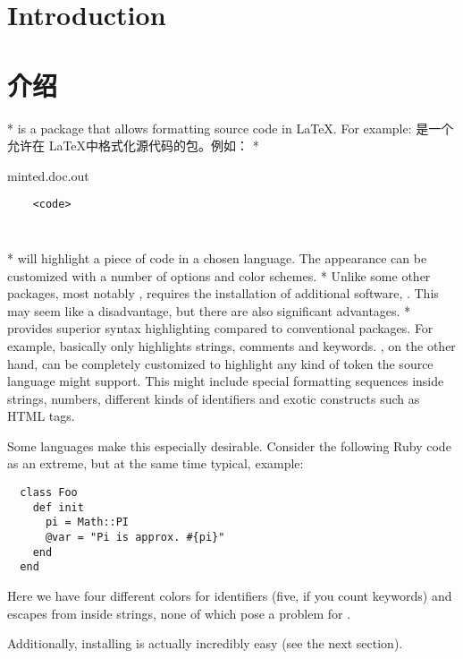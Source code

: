 \begin{paracol}{2}
\section{Introduction}
\switchcolumn
\section{介绍}
\switchcolumn[0]*%
 is a package that allows formatting source code in \LaTeX.
For example:
\switchcolumn
{} 是一个允许在 \LaTeX 中格式化源代码的包。例如：
\switchcolumn[0]*%
\begin{VerbatimOut}[gobble=1]{minted.doc.out}
  \begin{verbatim}
    <code>
  \end{verbatim}
\end{VerbatimOut}
\inputminted[gobble=2,frame=lines]{latex}{minted.doc.out}
\switchcolumn
\inputminted[gobble=2,frame=lines]{latex}{minted.doc.out}
\switchcolumn[0]*%
will highlight a piece of code in a chosen language.
The appearance can be customized with a number of options and color schemes.
\switchcolumn
\switchcolumn[0]*%
Unlike some other packages, most notably ,  requires
the installation of additional software, .
This may seem like a disadvantage, but there are also significant advantages.
\switchcolumn
\switchcolumn[0]*%
 provides superior syntax highlighting compared to conventional packages.
For example,  basically only highlights strings, comments and keywords.
, on the other hand, can be completely customized to highlight any kind of token the
source language might support.
This might include special formatting sequences inside strings, numbers, different kinds of
identifiers and exotic constructs such as HTML tags.

Some languages make this especially desirable.
Consider the following Ruby code as an extreme, but at the same time typical, example:

\begin{verbatim}
  class Foo
    def init
      pi = Math::PI
      @var = "Pi is approx. #{pi}"
    end
  end
\end{verbatim}

Here we have four different colors for identifiers (five, if you count keywords) and escapes from
inside strings, none of which pose a problem for .

Additionally, installing  is actually incredibly easy (see the next section).

\end{paracol}